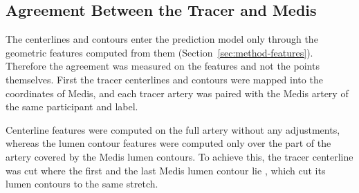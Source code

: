 \subsection{Agreement Between the Tracer and Medis}
\label{sec:method-medis-agreement}
The centerlines and contours enter the prediction model only through the geometric features computed from them (Section~\ref{sec:method-features}).                                                                           
Therefore the agreement was measured on the features and not the points themselves.
First the tracer centerlines and contours were mapped into the coordinates of Medis, and each tracer artery was paired with the Medis artery of the same participant and label.

Centerline features were computed on the full artery without any adjustments, whereas the lumen contour features were computed only over the part of the artery covered by the Medis lumen contours.
To achieve this, the tracer centerline was cut where the first and the last Medis lumen contour lie \cite{schaap2009cat08}, which cut its lumen contours to the same stretch.


